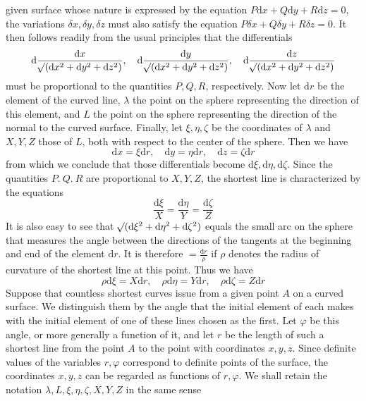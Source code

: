 %
given surface whose nature is expressed by the equation \(P\mathrm{d}x+Q\mathrm{d}y+R\mathrm{d}z=0\), the variations \(\delta x,\delta y,\delta z\) must also satisfy the equation \(P\delta x+Q\delta y+R\delta z=0\). It then follows readily from the usual principles that the differentials
\[
\mathrm{d}\frac{\mathrm{d}x}{\mathord{{}^{}\!\surd}(\mathrm{d}x^2+\mathrm{d}y^2+\mathrm{d}z^2)},\quad
\mathrm{d}\frac{\mathrm{d}y}{\mathord{{}^{}\!\surd}(\mathrm{d}x^2+\mathrm{d}y^2+\mathrm{d}z^2)},\quad
\mathrm{d}\frac{\mathrm{d}z}{\mathord{{}^{}\!\surd}(\mathrm{d}x^2+\mathrm{d}y^2+\mathrm{d}z^2)}
\]
must be proportional to the quantities \(P,Q,R\), respectively. Now let \(\mathrm{d}r\) be the element of the curved line, \(\lambda\) the point on the sphere representing the direction of this element, and \(L\) the point on the sphere representing the direction of the normal to the curved surface. Finally, let \(\xi,\eta,\zeta\) be the coordinates of \(\lambda\) and \(X,Y,Z\) those of \(L\), both with respect to the center of the sphere. Then we have
\[
\mathrm{d}x=\xi\mathrm{d}r,\quad\mathrm{d}y=\eta\mathrm{d}r,\quad\mathrm{d}z=\zeta\mathrm{d}r
\]
from which we conclude that those differentials become \(\mathrm{d}\xi,\mathrm{d}\eta,\mathrm{d}\zeta\). Since the quantities \(P\mathord{.}\ Q\mathord{.}\ R\) are proportional to \(X,Y,Z\), the shortest line is characterized by the equations
\[
\frac{\mathrm{d}\xi}{X}=\frac{\mathrm{d}\eta}{Y}=\frac{\mathrm{d}\zeta}{Z}
\]
It is also easy to see that \(\mathord{{}^{}\!\surd}(\mathrm{d}\xi^2+\mathrm{d}\eta^2+\mathrm{d}\zeta^2)\) equals the small arc on the sphere that measures the angle between the directions of the tangents at the beginning and end of the element \(\mathrm{d}r\). It is therefore \(=\frac{\mathrm{d}r}{\rho}\) if \(\rho\) denotes the radius of curvature of the shortest line at this point. Thus we have
\[
\rho\mathrm{d}\xi=X\mathrm{d}r,\quad\rho\mathrm{d}\eta=Y\mathrm{d}r,\quad\rho\mathrm{d}\zeta=Z\mathrm{d}r
\]
Suppose that countless shortest curves issue from a given point \(A\) on a curved surface. We distinguish them by the angle that the initial element of each makes with the initial element of one of these lines chosen as the first. Let \(\varphi\) be this angle, or more generally a function of it, and let \(r\) be the length of such a shortest line from the point \(A\) to the point with coordinates \(x,y,z\). Since definite values of the variables \(r,\varphi\) correspond to definite points of the surface, the coordinates \(x,y,z\) can be regarded as functions of \(r,\varphi\). We shall retain the notation \(\lambda,L,\xi,\eta,\zeta,X,Y,Z\) in the same sense
